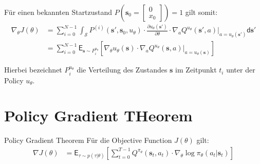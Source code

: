 \documentclass[a4paper, 12pt]{scrartcl}
\begin{document}
\begin{beweis}
    Für einen bekannten Startzustand 
    $P\left(\bm{s}_0 = \begin{bmatrix} 0 \\ x_0 \end{bmatrix}\right) = 1$ gilt somit:
    \begin{align*}
        \nabla_\theta J(\theta) 
        &=
        \sum_{i=0}^{N-1}
        \int_{\mathcal{S}} 
        P^{(i)}(\bm{s}', \bm{s}_0, u_\theta) 
        \cdot
        \frac{\partial u_\theta (\bm{s}')}{\partial \theta}
        \cdot
        \nabla_a Q^{u_{\theta}}(\bm{s}', a) \Big|_{a = u_\theta (\bm{s}')}
        \mathsf{d}\bm{s}'
        \\
        &=
        \sum_{i=0}^{N-1}
        \mathsf{E}_{\bm{s} \sim P_i^{u_\theta}}
        \left[
            \nabla_{\theta} u_\theta (\bm{s}) \cdot 
            \nabla_a Q^{u_{\theta}}(\bm{s}, a) \Big|_{a = u_\theta (\bm{s})}
        \right]
    \end{align*}

    Hierbei bezeichnet $P_i^{u_\theta}$ die Verteilung des Zustandes $\bm{s}$ 
    im Zeitpunkt $t_i$ unter der Policy $u_\theta$.
\end{beweis}



\newpage

\printbibliography

\newpage

\appendix

\section{Policy Gradient THeorem}\label{Appendix:Policy_Gradient_Theorem}


\begin{satz}{Policy Gradient Theorem}
    Für die Objective Function $J(\theta)$ gilt:
    \begin{align*}
        \nabla J(\theta)
        &=
        \mathsf{E}_{\tau \sim p(\tau|\theta)}
        \left[
            \sum_{t=0}^{T-1}
            Q^{\pi_{\theta}}(\bm{s}_t, a_t) \cdot 
            \nabla_{\theta} \log \pi_{\theta}(a_t|\bm{s}_t)
        \right]
    \end{align*}
\end{satz}
\end{document}
